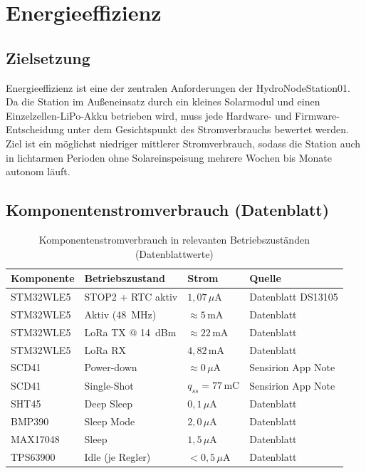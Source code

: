 \chapter{Energieeffizienz}
\label{cha:energie}

\section*{Zielsetzung}

Energieeffizienz ist eine der zentralen Anforderungen der HydroNodeStation01. Da die Station im Außeneinsatz durch ein kleines Solarmodul und einen Einzelzellen-LiPo-Akku betrieben wird, muss jede Hardware- und Firmware-Entscheidung unter dem Gesichtspunkt des Stromverbrauchs bewertet werden. Ziel ist ein möglichst niedriger mittlerer Stromverbrauch, sodass die Station auch in lichtarmen Perioden ohne Solareinspeisung mehrere Wochen bis Monate autonom läuft.

\section*{Komponentenstromverbrauch (Datenblatt)}

\begin{table}[H]
  \centering
  \begin{tabular}{llll}
    \hline
    \textbf{Komponente} & \textbf{Betriebszustand} & \textbf{Strom} & \textbf{Quelle} \\
    \hline
    STM32WLE5 & STOP2 + RTC aktiv        & $1{,}07\,\mu\text{A}$ & Datenblatt DS13105 \\
    STM32WLE5 & Aktiv (48~MHz)            & $\approx 5\,\text{mA}$  & Datenblatt \\
    STM32WLE5 & LoRa TX @ 14~dBm         & $\approx 22\,\text{mA}$ & Datenblatt \\
    STM32WLE5 & LoRa RX                   & $4{,}82\,\text{mA}$     & Datenblatt \\
    SCD41     & Power-down               & $\approx 0\,\mu\text{A}$ & Sensirion App Note \\
    SCD41     & Single-Shot              & $q_{ss} = 77\,\text{mC}$ & Sensirion App Note \\
    SHT45     & Deep Sleep               & $0{,}1\,\mu\text{A}$    & Datenblatt \\
    BMP390    & Sleep Mode               & $2{,}0\,\mu\text{A}$    & Datenblatt \\
    MAX17048  & Sleep                    & $1{,}5\,\mu\text{A}$    & Datenblatt \\
    TPS63900  & Idle (je Regler)         & $< 0{,}5\,\mu\text{A}$  & Datenblatt \\
    \hline
  \end{tabular}
  \caption{Komponentenstromverbrauch in relevanten Betriebszuständen (Datenblattwerte)}
  \label{tab:power-components}
\end{table}

